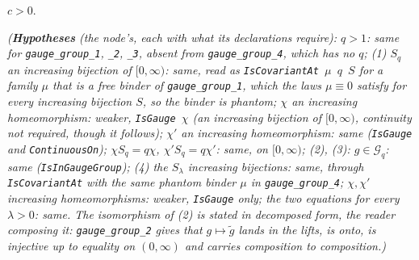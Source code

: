 \begin{lemma}
\begin{enumerate}
$c > 0$.
\end{enumerate}
\statusT\quad\emph{(\textbf{Hypotheses} (the node's, each with what its declarations require):
$q > 1$: same for \texttt{gauge\_group\_1}, \texttt{\_2}, \texttt{\_3}, absent
from \texttt{gauge\_group\_4}, which has no $q$; (1) $S_q$ an increasing bijection of
$[0,\infty)$: same, read as \texttt{IsCovariantAt}~$\mu$~$q$~$S$ for a family $\mu$ that is a free
binder of \texttt{gauge\_group\_1}, which the laws $\mu \equiv 0$ satisfy for every increasing
bijection $S$, so the binder is phantom; $\chi$ an increasing homeomorphism: weaker,
\texttt{IsGauge}~$\chi$ (an increasing bijection of $[0,\infty)$, continuity not required, though it
follows); $\chi'$ an increasing homeomorphism: same (\texttt{IsGauge} and \texttt{ContinuousOn});
$\chi S_q = q\chi$, $\chi'S_q = q\chi'$: same, on $[0,\infty)$; (2), (3): $g \in \mathcal{G}_q$:
same (\texttt{IsInGaugeGroup}); (4) the $S_\lambda$ increasing bijections: same, through
\texttt{IsCovariantAt} with the same phantom binder $\mu$ in \texttt{gauge\_group\_4}; $\chi, \chi'$
increasing homeomorphisms: weaker, \texttt{IsGauge} only; the two equations for every
$\lambda > 0$: same. The isomorphism of (2) is stated in decomposed form, the reader composing it:
\texttt{gauge\_group\_2} gives that $g \mapsto \tilde g$ lands in the lifts, is onto, is injective up
to equality on $(0,\infty)$ and carries composition to composition.)}
\end{lemma}

